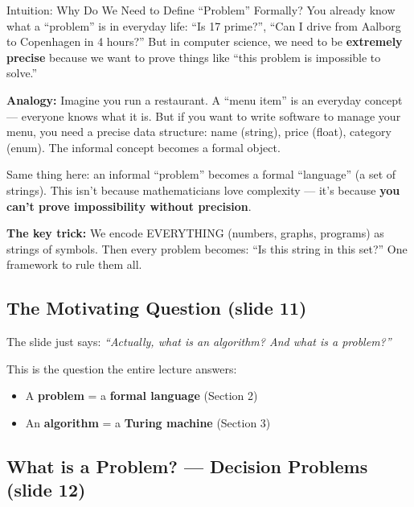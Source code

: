 \documentclass[11pt,a4paper]{article}
\begin{document}
\begin{conceptbox}{Intuition: Why Do We Need to Define ``Problem'' Formally?}
You already know what a ``problem'' is in everyday life: ``Is 17 prime?'', ``Can I drive from Aalborg to Copenhagen in 4 hours?'' But in computer science, we need to be \textbf{extremely precise} because we want to prove things like ``this problem is impossible to solve.''

\textbf{Analogy:} Imagine you run a restaurant. A ``menu item'' is an everyday concept --- everyone knows what it is. But if you want to write software to manage your menu, you need a precise data structure: name (string), price (float), category (enum). The informal concept becomes a formal object.

Same thing here: an informal ``problem'' becomes a formal ``language'' (a set of strings). This isn't because mathematicians love complexity --- it's because \textbf{you can't prove impossibility without precision}.

\textbf{The key trick:} We encode EVERYTHING (numbers, graphs, programs) as strings of symbols. Then every problem becomes: ``Is this string in this set?'' One framework to rule them all.
\end{conceptbox}

\subsection{The Motivating Question (slide 11)}

The slide just says: \textit{``Actually, what is an algorithm? And what is a problem?''}

This is the question the entire lecture answers:
\begin{itemize}[nosep]
\item A \textbf{problem} = a \textbf{formal language} (Section 2)
\item An \textbf{algorithm} = a \textbf{Turing machine} (Section 3)
\end{itemize}

\subsection{What is a Problem? --- Decision Problems (slide 12)}
\end{document}
